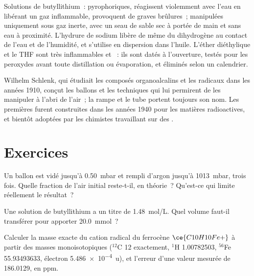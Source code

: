 \begin{safety}{}
Solutions de butyllithium~: pyrophoriques, réagissent violemment avec
l'eau en libérant un gaz inflammable, provoquent de graves brûlures~;
manipulées uniquement sous gaz inerte, avec un seau de sable sec à portée
de main et sans eau à proximité. L'hydrure de sodium libère de même du
dihydrogène au contact de l'eau et de l'humidité, et s'utilise en
dispersion dans l'huile. L'éther diéthylique et le THF sont très
inflammables et ~: ils sont datés à l'ouverture, testés pour
les peroxydes avant toute distillation ou évaporation, et éliminés selon un
calendrier.
\end{safety}

\begin{history}
Wilhelm Schlenk, qui étudiait les composés organoalcalins et les radicaux
dans les années 1910, conçut les ballons et les techniques qui lui
permirent de les manipuler à l'abri de l'air~; la rampe et le tube portent
toujours son nom. Les premières  furent construites dans les
années 1940 pour les matières radioactives, et bientôt adoptées par les
chimistes travaillant sur des .
\end{history}

\section{Exercices}

\begin{exercise}[$\star$]\label{exo:b3:lab-techniques-3:1}
Un ballon est vidé jusqu'à \qty{0.50}{mbar} et rempli d'argon jusqu'à \qty{1013}{mbar}, trois fois. Quelle fraction de
l'air initial reste-t-il, en théorie~? Qu'est-ce qui limite réellement le
résultat~?
\end{exercise}

\begin{exercise}[$\star$]\label{exo:b3:lab-techniques-3:2}
Une solution de butyllithium a un titre de \qty{1.48}{mol/L}. Quel volume faut-il transférer pour apporter
\qty{20.0}{mmol}~?
\end{exercise}

\begin{exercise}[$\star$]\label{exo:b3:lab-techniques-3:3}
Calculer la masse exacte du cation radical du ferrocène $\ce{C10H10Fe+}$ à partir des masses monoisotopiques
($^{12}$C 12 exactement, $^1$H 1.00782503, $^{56}$Fe 55.93493633, électron \qty{5.486e-4}{u}), et l'erreur d'une valeur mesurée de
186.0129, en ppm.
\end{exercise}

